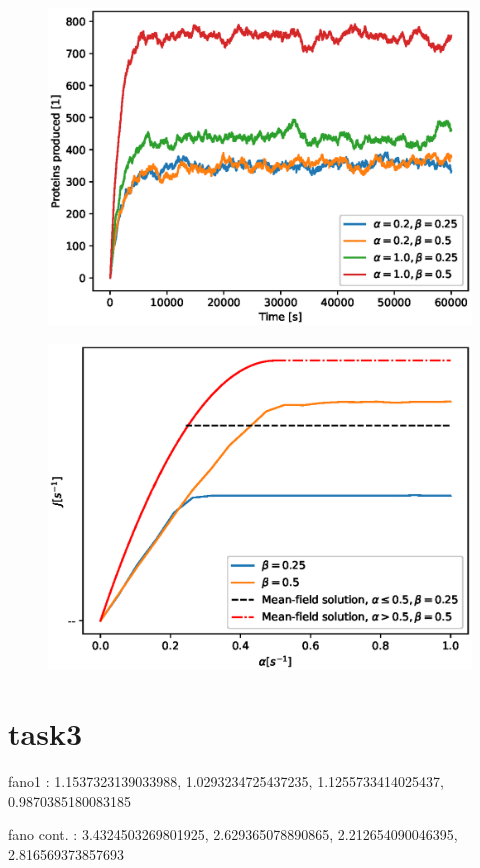 \documentclass{article}
\begin{document}
\begin{figure}[H]
	\centering
	\includegraphics[width = \linewidth]{figs/task2_prot_prod_v4.eps}
	\label{fig:task2_prot_prod}
\end{figure}

\begin{figure}[H]
	\centering
	\includegraphics[width = \linewidth]{figs/task2_meanfield_v4.eps}
	\label{fig:task2_mean-field}
\end{figure}



\section{task3}
fano1 : 1.1537323139033988,  1.0293234725437235, 1.1255733414025437,  0.9870385180083185


fano cont. : 3.4324503269801925, 2.629365078890865, 2.212654090046395, 2.816569373857693
\end{document}
